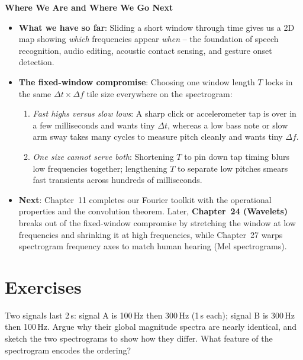 \begin{connectionbox}
\textbf{Where We Are and Where We Go Next}
\begin{itemize}
  \item \textbf{What we have so far}: Sliding a short window through time gives us a 2D map showing
  \emph{which} frequencies appear \emph{when} -- the foundation of speech recognition, audio
  editing, acoustic contact sensing, and gesture onset detection.
  \item \textbf{The fixed-window compromise}: Choosing one window length $T$ locks in the same
  $\Delta t \times \Delta f$ tile size everywhere on the spectrogram:
  \begin{enumerate}
    \item \emph{Fast highs versus slow lows}: A sharp click or accelerometer tap is over in a few
    milliseconds and wants tiny $\Delta t$, whereas a low bass note or slow arm sway takes many
    cycles to measure pitch cleanly and wants tiny $\Delta f$.
    \item \emph{One size cannot serve both}: Shortening $T$ to pin down tap timing blurs low
    frequencies together; lengthening $T$ to separate low pitches smears fast transients across
    hundreds of milliseconds.
  \end{enumerate}
  \item \textbf{Next}: Chapter~11 completes our Fourier toolkit with the operational properties and
  the convolution theorem. Later, \textbf{Chapter~24 (Wavelets)} breaks out of the fixed-window
  compromise by stretching the window at low frequencies and shrinking it at high frequencies, while
  Chapter~27 warps spectrogram frequency axes to match human hearing (Mel spectrograms).
\end{itemize}
\end{connectionbox}

\section{Exercises}
\label{ch10:exercises}

\begin{exercise}
\label{ch10:ex-order}
Two signals last 2\,s: signal A is 100\,Hz then 300\,Hz (1\,s each); signal B is
300\,Hz then 100\,Hz. Argue why their global magnitude spectra are nearly
identical, and sketch the two spectrograms to show how they differ. What feature
of the spectrogram encodes the ordering?
\end{exercise}

